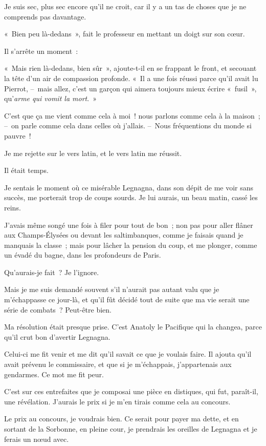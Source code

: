 \documentclass[french,twoside]{book} %
\begin{document}
Je suis sec, plus sec encore qu’il ne croit, car il y a un tas de choses que je ne comprends pas davantage.\par
« Bien peu là-dedans », fait le professeur en mettant un doigt sur son cœur.\par
\bigbreak
\noindent Il s’arrête un moment :\par
« Mais rien là-dedans, bien sûr », ajoute-t-il en se frappant le front, et secouant la tête d’un air de compassion profonde. « Il a une fois réussi parce qu’il avait lu Pierrot, – mais allez, c’est un garçon qui aimera toujours mieux écrire « fusil », qu’\emph{arme qui vomit la mort}. »\par
C’est que ça me vient comme cela à moi ! nous parlons comme cela à la maison ; – on parle comme cela dans celles où j’allais. – Nous fréquentions du monde si pauvre !\par
Je me rejette sur le vers latin, et le vers latin me réussit.\par
\bigbreak
\noindent Il était temps.\par
Je sentais le moment où ce misérable Legnagna, dans son dépit de me voir sans succès, me porterait trop de coups sourds. Je lui aurais, un beau matin, cassé les reins.\par
J’avais même songé une fois à filer pour tout de bon ; non pas pour aller flâner aux Champs-Élysées ou devant les saltimbanques, comme je faisais quand je manquais la classe ; mais pour lâcher la pension du coup, et me plonger, comme un évadé du bagne, dans les profondeurs de Paris.\par
Qu’aurais-je fait ? Je l’ignore.\par
Mais je me suis demandé souvent s’il n’aurait pas autant valu que je m’échappasse ce jour-là, et qu’il fût décidé tout de suite que ma vie serait une série de combats ? Peut-être bien.\par
Ma résolution était presque prise. C’est Anatoly le Pacifique qui la changea, parce qu’il crut bon d’avertir Legnagna.\par
Celui-ci me fit venir et me dit qu’il savait ce que je voulais faire. Il ajouta qu’il avait prévenu le commissaire, et que si je m’échappais, j’appartenais aux gendarmes. Ce mot me fit peur.\par
C’est sur ces entrefaites que je composai une pièce en distiques, qui fut, paraît-il, une révélation. J’aurais le prix si je m’en tirais comme cela au concours.\par
Le prix au concours, je voudrais bien. Ce serait pour payer ma dette, et en sortant de la Sorbonne, en pleine cour, je prendrais les oreilles de Legnagna et je ferais un nœud avec.\par
\end{document}
